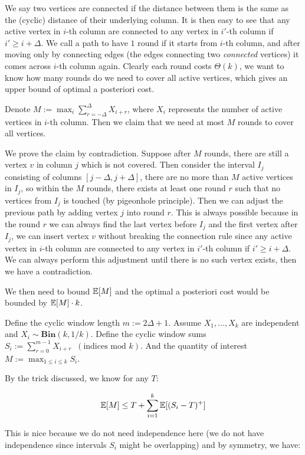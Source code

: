 \documentclass[12pt]{amsart}
\begin{document}
We say two vertices are connected if the distance between them is the same as the (cyclic) distance of their underlying column. It is then easy to see that any active vertex in $i$-th column are connected to any vertex in $i'$-th column if $i' \ge i + \Delta$. We call a path to have $1$ round if it starts from $i$-th column, and after moving only by connecting edges (the edges connecting  two \emph{connected} vertices) it comes across $i$-th column again. Clearly each round costs $\Theta(k)$, we want to know how many rounds do we need to cover all active vertices, which gives an upper bound of optimal a posteriori cost.

Denote $M := \max_{i} \sum_{r=-\Delta}^{\Delta} X_{i+r}$, where $X_i$ represents the number of active vertices in $i$-th column. Then we claim that we need at most $M$ rounds to cover all vertices.

We prove the claim by contradiction. Suppose after $M$ rounds, there are still a vertex $v$ in column $j$ which is not covered. Then consider the interval $I_j$ consisting of columns $[j - \Delta, j + \Delta]$, there are no more than $M$ active vertices in $I_j$, so within the $M$ rounds, there exists at least one round $r$ such that no vertices from $I_j$ is touched (by pigeonhole principle). Then we can adjust the previous path by adding vertex $j$ into round $r$. This is always possible because in the round $r$ we can always find the last vertex before $I_j$ and the first vertex after $I_j$, we can insert vertex $v$ without breaking the connection rule since   any active vertex in $i$-th column are connected to any vertex in $i'$-th column if $i' \ge i + \Delta$. We can always perform this adjustment until there is no such vertex exists, then we have a contradiction.

We then need to bound $\mathbb{E}[M]$ and the optimal a posteriori cost would be bounded by $\mathbb{E}[M] \cdot k$.

Define the cyclic window length $m := 2\Delta + 1$. Assume $X_1, \dots, X_k$ are independent and $X_i \sim \textbf{Bin}(k, 1/k)$. Define the cyclic window sums $S_i := \sum_{r=0}^{m-1} X_{i+r} \;\; (\text{indices mod } k)$. And the quantity of interest $M := \max_{1 \le i \le k} S_i$.

By the trick discussed, we know for any $T$:

\begin{align*}
    \mathbb{E}[M] \le T + \sum_{i=1}^k \mathbb{E}[(S_i - T)^+]
\end{align*}

This is nice because we do not need independence here (we do not have independence since intervals $S_i$ might be overlapping) and by symmetry, we have:
\end{document}
